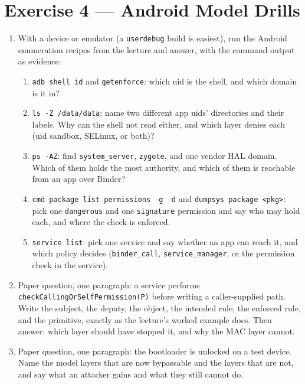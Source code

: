 \documentclass[12pt]{Training}
\begin{document}
\section*{Exercise 4 --- Android Model Drills}
\begin{enumerate}
    \item With a device or emulator (a \lstinline{userdebug} build is easiest), run the Android enumeration recipes from the lecture and answer, with the command output as evidence:
    \begin{enumerate}
        \item \lstinline{adb shell id} and \lstinline{getenforce}: which uid is the shell, and which domain is it in?
        \item \lstinline{ls -Z /data/data}: name two different app uids' directories and their labels. Why can the shell not read either, and which layer denies each (uid sandbox, SELinux, or both)?
        \item \lstinline{ps -AZ}: find \lstinline{system_server}, \lstinline{zygote}, and one vendor HAL domain. Which of them holds the most authority, and which of them is reachable from an app over Binder?
        \item \lstinline{cmd package list permissions -g -d} and \lstinline{dumpsys package <pkg>}: pick one \lstinline{dangerous} and one \lstinline{signature} permission and say who may hold each, and where the check is enforced.
        \item \lstinline{service list}: pick one service and say whether an app can reach it, and which policy decides (\lstinline{binder_call}, \lstinline{service_manager}, or the permission check in the service).
    \end{enumerate}
    \item Paper question, one paragraph: a service performs \lstinline{checkCallingOrSelfPermission(P)} before writing a caller-supplied path. Write the subject, the deputy, the object, the intended rule, the enforced rule, and the primitive, exactly as the lecture's worked example does. Then answer: which layer should have stopped it, and why the MAC layer cannot.
    \item Paper question, one paragraph: the bootloader is unlocked on a test device. Name the model layers that are now bypassable and the layers that are not, and say what an attacker gains and what they still cannot do.
\end{enumerate}
\end{document}
